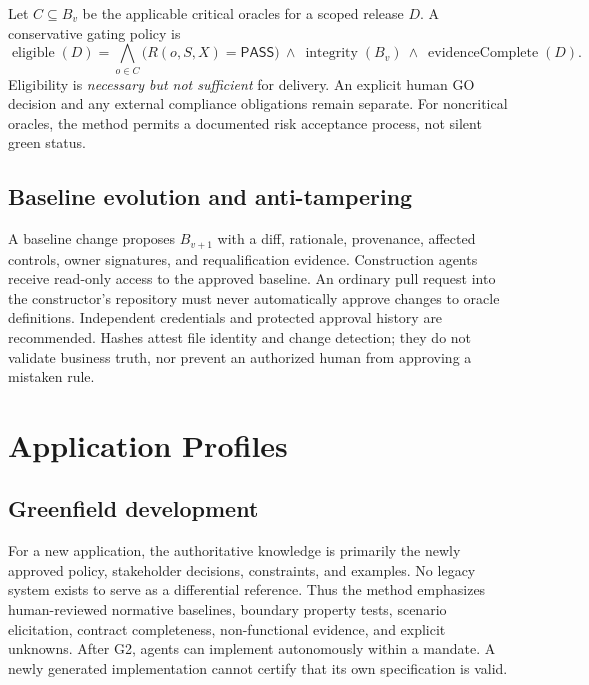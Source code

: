 \documentclass[11pt,a4paper]{article}
\newcommand{\PASS}{\textsf{PASS}}
\begin{document}
Let $C\subseteq B_v$ be the applicable critical oracles for a scoped release $D$. A conservative gating policy is
\begin{equation}
\operatorname{eligible}(D)=\bigwedge_{o\in C}
\big(R(o,S,X)=\PASS{}\big)\ \land\ \operatorname{integrity}(B_v)\ \land\ \operatorname{evidenceComplete}(D).
\end{equation}
Eligibility is \emph{necessary but not sufficient} for delivery. An explicit human \textsf{GO} decision and any external compliance obligations remain separate. For noncritical oracles, the method permits a documented risk acceptance process, not silent green status.

\subsection{Baseline evolution and anti-tampering}
A baseline change proposes $B_{v+1}$ with a diff, rationale, provenance, affected controls, owner signatures, and requalification evidence. Construction agents receive read-only access to the approved baseline. An ordinary pull request into the constructor's repository must never automatically approve changes to oracle definitions. Independent credentials and protected approval history are recommended. Hashes attest file identity and change detection; they do not validate business truth, nor prevent an authorized human from approving a mistaken rule.

\section{Application Profiles}
\subsection{Greenfield development}
For a new application, the authoritative knowledge is primarily the newly approved policy, stakeholder decisions, constraints, and examples. No legacy system exists to serve as a differential reference. Thus the method emphasizes human-reviewed normative baselines, boundary property tests, scenario elicitation, contract completeness, non-functional evidence, and explicit unknowns. After G2, agents can implement autonomously within a mandate. A newly generated implementation cannot certify that its own specification is valid.
\end{document}

